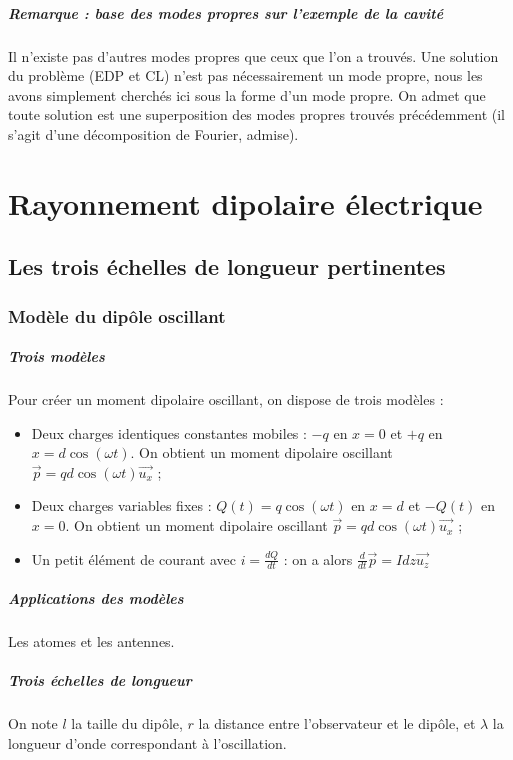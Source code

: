\documentclass[french]{book}
\theoremstyle{plain}
\theoremstyle{definition}
\theoremstyle{remark}
\begin{document}
\paragraph{Remarque : base des modes propres sur l'exemple de la cavité} Il n'existe pas d'autres modes propres que ceux que l'on a trouvés. Une solution du problème (EDP et CL) n'est pas nécessairement un mode propre, nous les avons simplement cherchés ici sous la forme d'un mode propre. On admet que toute solution est une superposition des modes propres trouvés précédemment (il s'agit d'une décomposition de Fourier, admise).
\chapter{Rayonnement dipolaire électrique}
\localtableofcontents
\section{Les trois échelles de longueur pertinentes}
\subsection{Modèle du dipôle oscillant}
\paragraph{Trois modèles} Pour créer un moment dipolaire oscillant, on dispose de trois modèles :
\begin{itemize}
	\item Deux charges identiques constantes mobiles : $-q$ en $x=0$ et $+q$ en $x=d\cos(\omega t)$. On obtient un moment dipolaire oscillant $\overrightarrow{p}=qd\cos(\omega t)\overrightarrow{u_x}$ ;
	\item Deux charges variables fixes : $Q(t)=q\cos(\omega t)$ en $x=d$ et $-Q(t)$ en $x=0$. On obtient un moment dipolaire oscillant $\overrightarrow{p}=qd\cos(\omega t)\overrightarrow{u_x}$ ;
	\item Un petit élément de courant avec $i=\displaystyle\frac{dQ}{dt}$ : on a alors $\displaystyle\frac{d}{dt}\overrightarrow{p}=Idz\overrightarrow{u_z}$
\end{itemize}
\paragraph{Applications des modèles} Les atomes et les antennes.
\paragraph{Trois échelles de longueur} On note $l$ la taille du dipôle, $r$ la distance entre l'observateur et le dipôle, et $\lambda$ la longueur d'onde correspondant à l'oscillation.
\end{document}
